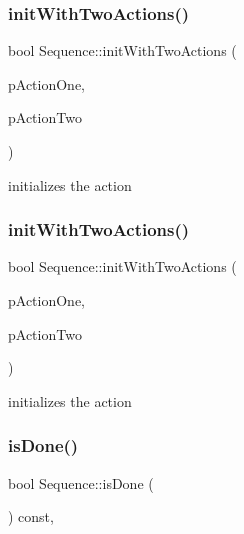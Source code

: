 \subsubsection{\texorpdfstring{init\+With\+Two\+Actions()}{initWithTwoActions()}\hspace{0.1cm}{\footnotesize\ttfamily [1/2]}}
{\footnotesize\ttfamily bool Sequence\+::init\+With\+Two\+Actions (\begin{DoxyParamCaption}\item[{\hyperlink{classFiniteTimeAction}{Finite\+Time\+Action} $\ast$}]{p\+Action\+One,  }\item[{\hyperlink{classFiniteTimeAction}{Finite\+Time\+Action} $\ast$}]{p\+Action\+Two }\end{DoxyParamCaption})}

initializes the action \mbox{\label{classSequence_ae4324a26f6f238fd448ff7261e5f7c5e}} 
\subsubsection{\texorpdfstring{init\+With\+Two\+Actions()}{initWithTwoActions()}\hspace{0.1cm}{\footnotesize\ttfamily [2/2]}}
{\footnotesize\ttfamily bool Sequence\+::init\+With\+Two\+Actions (\begin{DoxyParamCaption}\item[{\hyperlink{classFiniteTimeAction}{Finite\+Time\+Action} $\ast$}]{p\+Action\+One,  }\item[{\hyperlink{classFiniteTimeAction}{Finite\+Time\+Action} $\ast$}]{p\+Action\+Two }\end{DoxyParamCaption})}

initializes the action \mbox{\label{classSequence_a2f331fff9e2ab6e63569f55615a1c03e}} 
\subsubsection{\texorpdfstring{is\+Done()}{isDone()}}
{\footnotesize\ttfamily bool Sequence\+::is\+Done (\begin{DoxyParamCaption}\item[{void}]{ }\end{DoxyParamCaption}) const\hspace{0.3cm}{\ttfamily [override]}, {\ttfamily [virtual]}}

